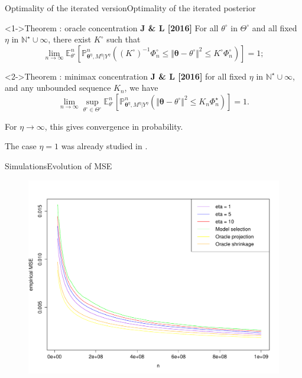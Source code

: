 \documentclass[10pt]{beamer}
\begin{document}
\begin{frame}{Optimality of the iterated version}{Optimality of the iterated posterior}
\begin{block}<1->{Theorem : oracle concentration \textbf{J \& L [2016]}}
For all $\theta^{\circ}$ in $\Theta^{\circ}$ and all fixed $\eta$ in $\mathbb{N}^{\star} \cup \infty$, there exist $K^{\circ}$ such that
	\[\lim\limits_{n \rightarrow \infty} \mathbb{E}_{\theta^{\circ}}^{n}\left[\mathbb{P}_{\boldsymbol{\theta}^{\eta}, M^{\eta} \vert Y^{\eta}}^{n}\left(\left(K^{\circ}\right)^{-1} \Phi_{n}^{\circ} \leq \Vert \boldsymbol{\theta} - \theta^{\circ} \Vert^{2} \leq K^{\circ} \Phi_{n}^{\circ} \right)\right] = 1;\]
\end{block}
\begin{block}<2->{Theorem : minimax concentration \textbf{J \& L [2016]}}
for all fixed $\eta$ in $\mathbb{N}^{\star} \cup \infty$, and any unbounded sequence $K_{n}$, we have
	\[\lim\limits_{n \rightarrow \infty} \sup\limits_{\theta^{\circ} \in \Theta^{\circ}} \mathbb{E}_{\theta^{\circ}}^{n}\left[\mathbb{P}_{\boldsymbol{\theta}^{\eta}, M^{\eta} \vert Y^{\eta}}^{n}\left(\Vert \boldsymbol{\theta} - \theta^{\circ} \Vert^{2} \leq K_{n} \Phi_{n}^{\star} \right)\right] = 1.\]
	\end{block}

For $\eta \rightarrow \infty$, this gives convergence in probability.

The case $\eta = 1$ was already studied in \textbf{\citet{JJASRS}}.
\end{frame}

\begin{frame}{Simulations}{Evolution of MSE}
\begin{figure}
\centering
\includegraphics[width=.9\linewidth]{EQM1.pdf}
\end{figure}
\end{frame}
\end{document}
